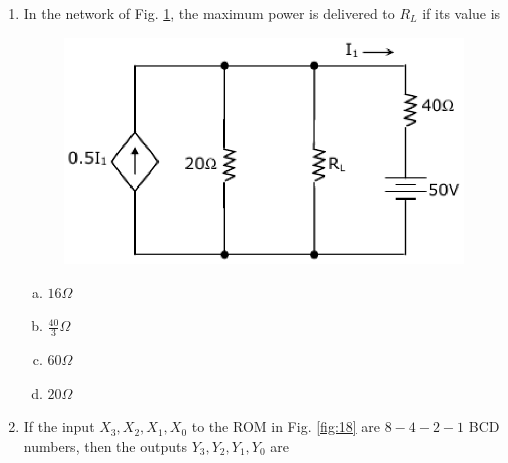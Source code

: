 \documentclass[journal,12pt,twocolumn]{IEEEtran}
\begin{document}
\begin{enumerate}
\begin{enumerate}[(a)]
\end{enumerate}

\item In the network of Fig. \ref{fig:17}, the maximum power is delivered to $R_L$ if its value is 

\begin{figure}

\centering

\includegraphics[width=\columnwidth]{./figs/21.eps}

\caption{}

\label{fig:17}

\end{figure} 



\begin{enumerate}[(a)]
 
\item $
16 \Omega $

\item $
\frac{40}{3} \Omega $


\item $
60 \Omega $

\item $
20 \Omega $


\end{enumerate}

\item If the input $X_3,X_2,X_1,X_0$ to the ROM in Fig. \ref{fig:18} are $8-4-2-1$ BCD numbers, then the outputs $Y_3,Y_2,Y_1,Y_0$ are

\begin{figure}

\centering


\end{figure}
\end{enumerate}
\end{document}
